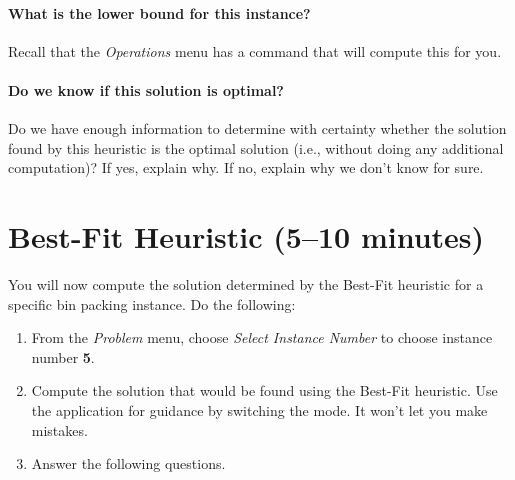 \documentclass[11pt,letterpaper]{article}
\begin{document}
\vspace*{2in}

\paragraph*{What is the lower bound for this instance?} Recall that the
{\em Operations} menu has a command that will compute this for you.

\vspace*{0.25in}

\paragraph*{Do we know if this solution is optimal?} Do we have enough 
information to determine with certainty whether the solution found by
this heuristic is the optimal solution (i.e., without doing any additional
computation)? If yes, explain why. If no, explain why we don't know for sure.

\vspace*{1in}


\newpage

\section{Best-Fit Heuristic (5--10 minutes)}\label{sec:bf}


You will now compute the solution determined by the Best-Fit
heuristic for a specific bin packing instance. Do the following:
\begin{enumerate}[leftmargin=*, parsep=0pt, itemsep=2pt, topsep=2pt]
\item From the {\em Problem} menu, choose {\em Select Instance Number}
to choose instance number \textbf{5}.
\item Compute the solution that would be found using the Best-Fit 
heuristic. Use the application for guidance by switching the mode.
It won't let you make mistakes.
\item Answer the following questions.
\end{enumerate}
\end{document}
